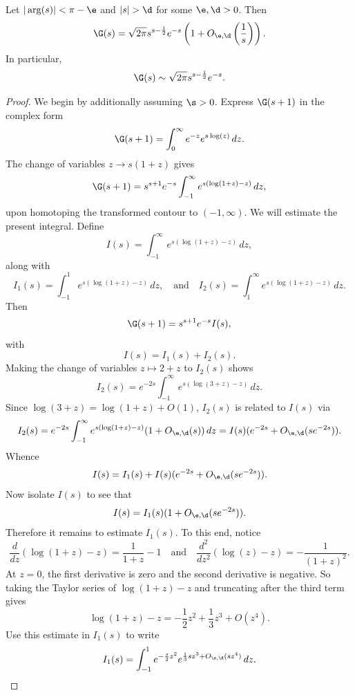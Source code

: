  \begin{theorem*}
    Let \(|\arg(s)| < \pi-\e\) and \(|s| > \d\) for some \(\e,\d > 0\). Then
    \[
      \G(s) = \sqrt{2\pi}s^{s-\frac{1}{2}}e^{-s}\left(1+O_{\e,\d}\left(\frac{1}{s}\right)\right).
    \]
    In particular,
    \[
      \G(s) \sim \sqrt{2\pi}s^{s-\frac{1}{2}}e^{-s}.
    \]
  \end{theorem*}
  \begin{proof}
    We begin by additionally assuming \(\s > 0\). Express \(\G(s+1)\) in the complex form
    \[
      \G(s+1) = \int_{0}^{\infty}e^{-z}e^{s\log(z)}\,dz.
    \]
    The change of variables \(z \to s(1+z)\) gives
    \[
      \G(s+1) = s^{s+1}e^{-s}\int_{-1}^{\infty}e^{s(\log(1+z)-z)}\,dz,
    \]
    upon homotoping the transformed contour to \((-1,\infty)\). We will estimate the present integral. Define
    \[
      I(s) = \int_{-1}^{\infty}e^{s(\log(1+z)-z)}\,dz,
    \]
    along with
    \[
      I_{1}(s) = \int_{-1}^{1}e^{s(\log(1+z)-z)}\,dz, \quad \text{and} \quad I_{2}(s) = \int_{1}^{\infty}e^{s(\log(1+z)-z)}\,dz.
    \]
    Then
    \begin{equation}\label{equ:Stirlings_formula_1}
      \G(s+1) = s^{s+1}e^{-s}I(s),
    \end{equation}
    with
    \[
      I(s) = I_{1}(s)+I_{2}(s).
    \]
    Making the change of variables \(z \mapsto 2+z\) to \(I_{2}(s)\) shows
    \[
      I_{2}(s) = e^{-2s}\int_{-1}^{\infty}e^{s(\log(3+z)-z)}\,dz.
    \]
    Since \(\log(3+z) = \log(1+z)+O(1)\), \(I_{2}(s)\) is related to \(I(s)\) via
    \[
      I_{2}(s) = e^{-2s}\int_{-1}^{\infty}e^{s(\log(1+z)-z)}(1+O_{\e,\d}(s))\,dz = I(s)(e^{-2s}+O_{\e,\d}(se^{-2s})).
    \]
    Whence
    \[
      I(s) = I_{1}(s)+I(s)(e^{-2s}+O_{\e,\d}(se^{-2s})).
    \]
    Now isolate \(I(s)\) to see that
    \begin{equation}\label{equ:Stirlings_formula_2}
      I(s) = I_{1}(s)(1+O_{\e,\d}(se^{-2s})).
    \end{equation}
    Therefore it remains to estimate \(I_{1}(s)\). To this end, notice
    \[
      \frac{d}{dz}(\log(1+z)-z) = \frac{1}{1+z}-1 \quad \text{and} \quad \frac{d^{2}}{dz^{2}}(\log(z)-z) = -\frac{1}{(1+z)^{2}}.
    \]
    At \(z = 0\), the first derivative is zero and the second derivative is negative. So taking the Taylor series of \(\log(1+z)-z\) and truncating after the third term gives
    \[
      \log(1+z)-z = -\frac{1}{2}z^{2}+\frac{1}{3}z^{3}+O(z^{4}).
    \]
    Use this estimate in \(I_{1}(s)\) to write
    \[
      I_{1}(s) = \int_{-1}^{1}e^{-\frac{s}{2}z^{2}}e^{\frac{1}{3}sz^{3}+O_{\e,\d}(sz^{4})}\,dz.
\]
\end{proof}
